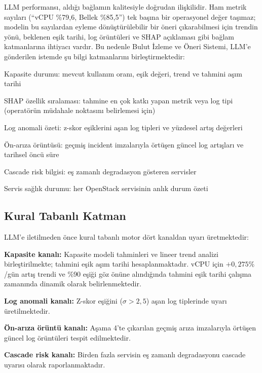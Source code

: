 LLM performansı, aldığı bağlamın kalitesiyle doğrudan ilişkilidir.
Ham metrik sayıları (``vCPU \%79{,}6, Bellek \%85{,}5'') tek başına bir operasyonel değer taşımaz; modelin bu sayılardan eyleme dönüştürülebilir bir öneri çıkarabilmesi için trendin yönü, beklenen eşik tarihi, log örüntüleri ve SHAP açıklaması gibi bağlam katmanlarına ihtiyacı vardır.
Bu nedenle Bulut İzleme ve Öneri Sistemi, LLM'e gönderilen istemde şu bilgi katmanlarını birleştirmektedir:

\begin{maddelendir}[label=--]
    \item Kapasite durumu: mevcut kullanım oranı, eşik değeri, trend ve tahmini aşım tarihi
    \item SHAP özellik sıralaması: tahmine en çok katkı yapan metrik veya log tipi (operatörün müdahale noktasını belirlemesi için)
    \item Log anomali özeti: z-skor eşiklerini aşan log tipleri ve yüzdesel artış değerleri
    \item Ön-arıza örüntüsü: geçmiş incident imzalarıyla örtüşen güncel log artışları ve tarihsel öncü süre
    \item Cascade risk bilgisi: eş zamanlı degradasyon gösteren servisler
    \item Servis sağlık durumu: her OpenStack servisinin anlık durum özeti
\end{maddelendir}

\subsection{Kural Tabanlı Katman}

LLM'e iletilmeden önce kural tabanlı motor dört kanaldan uyarı üretmektedir:
\begin{maddelendir}[label=\arabic*.]
    \item \textbf{Kapasite kanalı:} Kapasite modeli tahminleri ve lineer trend analizi birleştirilmekte; tahmini eşik aşım tarihi hesaplanmaktadır. vCPU için $+0{,}275\%$/gün artış trendi ve \%90 eşiği göz önüne alındığında tahmini eşik tarihi çalışma zamanında dinamik olarak belirlenmektedir.
    \item \textbf{Log anomali kanalı:} Z-skor eşiğini ($\sigma > 2{,}5$) aşan log tiplerinde uyarı üretilmektedir.
    \item \textbf{Ön-arıza örüntü kanalı:} Aşama 4'te çıkarılan geçmiş arıza imzalarıyla örtüşen güncel log örüntüleri tespit edilmektedir.
    \item \textbf{Cascade risk kanalı:} Birden fazla servisin eş zamanlı degradasyonu cascade uyarısı olarak raporlanmaktadır.
\end{maddelendir}

